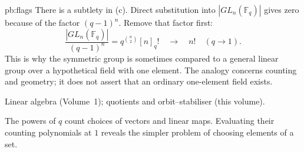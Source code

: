 \begin{solution}{pb:flags}
There is a subtlety in (c). Direct substitution into $|GL_n(\mathbb F_q)|$ gives zero because of the factor $(q-1)^n$. Remove that factor first:
\[
\frac{|GL_n(\mathbb F_q)|}{(q-1)^n}=q^{\binom n2}[n]_q!
\quad\longrightarrow\quad n!\quad(q\to1).
\]
This is why the symmetric group is sometimes compared to a general linear group over a hypothetical field with one element. The analogy concerns counting and geometry; it does not assert that an ordinary one-element field exists.

\tools Linear algebra (Volume~1); quotients and orbit--stabiliser (this volume).

\leads The powers of $q$ count choices of vectors and linear maps. Evaluating their counting polynomials at $1$ reveals the simpler problem of choosing elements of a set.
\end{solution}

